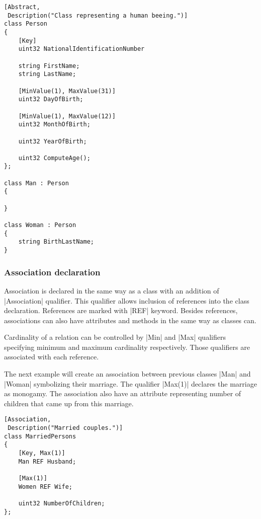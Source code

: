 \begin{lstlisting}[caption={MOF example: Person},
label=lst:wbem:mof:class]
[Abstract,
 Description("Class representing a human beeing.")]
class Person
{
    [Key]
    uint32 NationalIdentificationNumber
    
    string FirstName;
    string LastName;
    
    [MinValue(1), MaxValue(31)]
    uint32 DayOfBirth;
    
    [MinValue(1), MaxValue(12)]
    uint32 MonthOfBirth;
    
    uint32 YearOfBirth;
    
    uint32 ComputeAge();
};

class Man : Person
{

}

class Woman : Person
{
    string BirthLastName;
}
\end{lstlisting}

\subsubsection{Association declaration}
\label{wbem:cim:mof:instance}

Association is declared in the same way as a class with an addition of
|Association| qualifier. This qualifier allows inclusion of references into the
class declaration. References are marked with |REF| keyword. Besides references,
associations can also have attributes and methods in the same way as classes
can.

Cardinality of a relation can be controlled by |Min| and |Max| qualifiers
specifying minimum and maximum cardinality respectively. Those qualifiers are
associated with each reference.

The next example will create an association between previous classes |Man| and
|Woman| symbolizing their marriage. The qualifier |Max(1)| declares the marriage
as monogamy. The association also have an attribute representing number of
children that came up from this marriage.

\begin{lstlisting}[caption={MOF example: association},
label=lst:wbem:mof:association]
[Association,
 Description("Married couples.")]
class MarriedPersons
{
    [Key, Max(1)]
    Man REF Husband;
    
    [Max(1)]
    Women REF Wife;
    
    uint32 NumberOfChildren;
};
\end{lstlisting}

